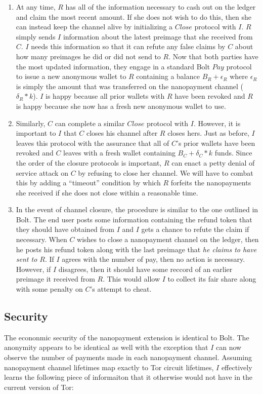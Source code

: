 \documentclass{article}
\begin{document}
\begin{enumerate}
\item At any time, $R$ has all of the information necessary to cash out on the ledger and claim the most recent amount. If she does not wish to do this, then she can instead keep the channel alive by initializing a $Close$ protocol with $I$. $R$ simply sends $I$ information about the latest preimage that she received from $C$. $I$ needs this information so that it can refute any false claims by $C$ about how many preimages he did or did not send to $R$. Now that both parties have the most updated information, they engage in a standard Bolt $Pay$ protocol to issue a new anonymous wallet to $R$ containing a balance $B_R + \epsilon_R$ where $\epsilon_R$ is simply the amount that was transferred on the nanopayment channel ($\delta_R * k$). $I$ is happy because all prior wallets with $R$ have been revoked and $R$ is happy because she now has a fresh new anonymous wallet to use.

\item Similarly, $C$ can complete a similar $Close$ protocol with $I$. However, it is important to $I$ that $C$ closes his channel after $R$ closes hers. Just as before, $I$ leaves this protocol with the assurance that all of $C$'s prior wallets have been revoked and $C$ leaves with a fresh wallet containing $B_C + \delta_C * k$ funds. Since the order of the closure protocols is important, $R$ can enact a petty denial of service attack on $C$ by refusing to close her channel. We will have to combat this by adding a ``timeout'' condition by which $R$ forfeits the nanopayments she received if she does not close within a reasonable time.

\item In the event of channel closure, the procedure is similar to the one outlined in Bolt. The end user posts some information containing the refund token that they should have obtained from $I$ and $I$ gets a chance to refute the claim if necessary. When $C$ wishes to close a nanopayment channel on the ledger, then he posts his refund token along with the last preimage that \emph{he claims to have sent to $R$}. If $I$ agrees with the number of pay, then no action is necessary. However, if $I$ disagrees, then it should have some reccord of an earlier preimage it received from $R$. This would allow $I$ to collect its fair share along with some penalty on $C$'s attempt to cheat.
\end{enumerate}

\subsection{Security}
The econonmic security of the nanopayment extension is identical to Bolt. The anonymity appears to be identical as well with the exception that $I$ can now observe the number of payments made in each nanopayment channel. Assuming nanopayment channel lifetimes map exactly to Tor circuit lifetimes, $I$ effectively learns the following piece of informaiton that it otherwise would not have in the current version of Tor:
\end{document}

